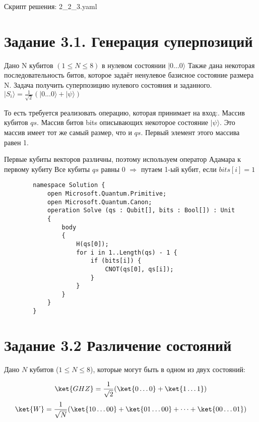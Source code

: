 \documentclass{article}
\begin{document}
Скрипт решения: 2\_2\_3.yaml\newline

\section{Задание 3.1. Генерация суперпозиций}
Дано N кубитов $(1 \leq N \leq 8)$ в нулевом состоянии $|0 . . . 0\rangle$\newline
Также дана некоторая последовательность битов, которое задаёт ненулевое базисное состояние размера N. Задача получить суперпозицию нулевого состояния и заданного.\newline
$|S_i\rangle = \frac{1} {\sqrt2} (|0 . . . 0\rangle + |\psi\rangle)$\newline

То есть требуется реализовать операцию, которая принимает на вход:. Массив кубитов $qs$. Массив битов bits описывающих некоторое состояние $|\psi\rangle$. Это массив имеет тот же самый
размер, что и $qs$.
Первый элемент этого массива равен 1.\newline

Первые кубиты векторов различны, поэтому используем оператор Адамара к первому кубиту
Все кубиты $qs$ равны 0 $\Rightarrow$ путаем 1-ый кубит, если $bits[i] = 1$


\begin{lstlisting}
        namespace Solution {
            open Microsoft.Quantum.Primitive;
            open Microsoft.Quantum.Canon;
            operation Solve (qs : Qubit[], bits : Bool[]) : Unit 
            {
                body
                {
                    H(qs[0]);
                    for i in 1..Length(qs) - 1 {
                        if (bits[i]) {
                            CNOT(qs[0], qs[i]);
                        }
                    }
                }
            }
        }
\end{lstlisting}
 

\section{Задание 3.2 Различение состояний}   
    
Дано $N$ кубитов ($1 \le N \le 8$), которые могут быть в одном из двух состояний:
    
    $$\ket{GHZ} = \frac{1}{\sqrt2}(\ket{0\dots0} +\ket{1\dots1})$$
    $$\ket{W} = \frac{1}{\sqrt N}(\ket{10\dots00}+\ket{01\dots00} + \dots +\ket{00\dots01})$$
    
\end{document}
